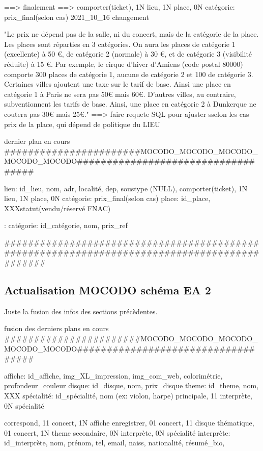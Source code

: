 \documentclass[12pt,a4paper]{article}
\begin{document}
{==> finalement 
==> comporter(ticket), 1N lieu, 1N place, 0N catégorie: prix_final(selon cas)
2021_10_16 changement 


"Le prix ne dépend pas de la salle, ni du concert, mais de la catégorie de la place. Les places sont réparties en 3 catégories. On aura les places de catégorie 1 (excellente) à 50 €, de catégorie 2 (normale) à 30 €, et de catégorie 3 (visibilité réduite) à 15 €. Par exemple, le cirque d'hiver d'Amiens (code postal 80000) comporte 300 places de catégorie 1, aucune de catégorie 2 et 100 de catégorie 3.
Certaines villes ajoutent une taxe sur le tarif de base. Ainsi une place en catégorie 1 à Paris ne sera pas 50€ mais 60€. D’autres villes, au contraire, subventionnent les tarifs de base. Ainsi, une place en catégorie 2 à Dunkerque ne coutera pas 30€ mais 25€."
==> faire requete SQL pour ajuster sselon les cas prix de la place, qui dépend de politique du LIEU



dernier plan en cours
#######################MOCODO_MOCODO_MOCODO_MOCODO_MOCODO###################################


lieu: id_lieu, nom, adr, localité, dep, soustype (NULL),
comporter(ticket), 1N lieu, 1N place, 0N catégorie: prix_final(selon cas)
place: id_place, XXXstatut(vendu/réservé FNAC)

:
catégorie: id_catégorie, nom, prix_ref

#############################################################################################





\subsection{Actualisation MOCODO schéma EA 2}
Juste la fusion des infos des sections précèdentes.

fusion des derniers plans en cours
#######################MOCODO_MOCODO_MOCODO_MOCODO_MOCODO###################################

affiche: id_affiche, img_XL_impression, img_com_web, colorimétrie, profondeur_couleur
disque: id_disque, nom, prix_disque
theme: id_theme, nom, XXX
spécialité: id_spécialité, nom (ex: violon, harpe)
principale, 11 interprète, 0N spécialité

correspond, 11 concert, 1N affiche
enregistrer, 01 concert, 11 disque
thématique, 01 concert, 1N theme
secondaire, 0N interprète, 0N spécialité
interprète: id_interprète, nom, prénom, tel, email, naiss, nationalité, résumé_bio,

}
\end{document}
